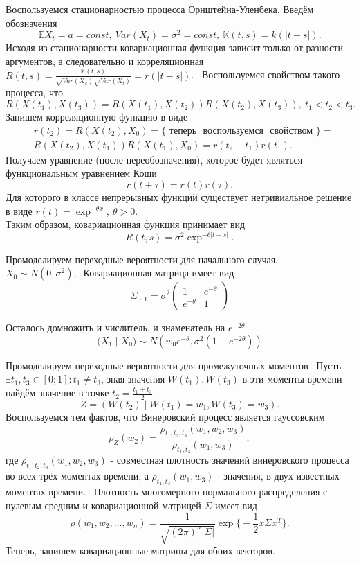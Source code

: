 \documentclass[11pt]{article}
\begin{document}
Воспользуемся стационарностью процесса Орнштейна-Уленбека. Введём обозначения
$$
    \mathbb{E}X_t = a = const,~ Var(X_t) = \sigma^2 = const,~ \mathbb{K}(t, s) = k(|t-s|).
$$
Исходя из стационарности ковариационная функция зависит только от разности аргументов, а следовательно и корреляционная $R(t, s) = \frac{\mathbb{K}(t,s)}{\sqrt{Var(X_s)} \sqrt{Var(X_t)}} = r(|t-s|)$. \
Воспользуемся свойством такого процесса, что 
$$
    R(X(t_1), X(t_3)) = R(X(t_1), X(t_2)) R(X(t_2), X(t_3)), ~ t_1 < t_2 < t_3.
$$
Запишем корреляционную функцию в виде
$$
\begin{aligned}
    & r(t_2) = R(X(t_2), X_0) = \{ \text{ теперь~ воспользуемся~ свойством } \} = \\
    & R(X(t_2), X(t_1)) R(X(t_1), X_0) = r(t_2 - t_1) r(t_1).
\end{aligned}
$$
Получаем уравнение (после переобозначения), которое будет являться функциональным уравнением Коши
$$
    r(t+ \tau) = r(t) r(\tau).
$$
Для которого в классе непрерывных функций существует нетривиальное решение в виде $r(t) = \exp^{ - \theta x},~ \theta > 0$. \\
Таким образом, ковариационная функция принимает вид
$$
    R(t, s) = \sigma^2 \exp^{- \theta |t-s|}.
$$

Промоделируем переходные вероятности для начального случая. \\
$X_0 \sim N(0, \sigma^2),~ $ Ковариационная матрица имеет вид
$$
\Sigma_{0,1} = \sigma^2
\begin{pmatrix}
1 & e^{-\theta} \\
e^{-\theta} & 1
\end{pmatrix}
$$


Осталось домножить и числитель, и знаменатель на $e^{-2\theta}$
$$
    \Big( X_1 \mid X_0 \Big) \sim N(w_0 e^{-\theta}, \sigma^2 (1 -e^{-2 \theta}))
$$ 

Промоделируем переходные вероятности для промежуточных моментов \
Пусть $\exists t_1, t_3 \in [0;1] : t_1 \ne t_3$, зная значения $W(t_1), W(t_3)$ в эти моменты времени найдём значение в точке $t_2 = \frac{t_1 + t_3}{2}$. 
$$
    Z = (W(t_2) \mid W(t_1)=w_1, W(t_3) = w_3).
$$
Воспользуемся тем фактов, что Винеровский процесс является гауссовским
$$
    \rho_Z(w_2) = \frac{\rho_{t_1,t_2,t_3}(w_1, w_2, w_3)}{\rho_{t_1, t_3}(w_1, w_3)},
$$
где $\rho_{t_1, t_2, t_3}(w_1, w_2, w_3)$ - совместная плотность значений винеровского процесса во всех трёх моментах времени, а $\rho_{t_1, t_3}(w_1, w_3)$ - значения, в двух известных моментах времени. \
Плотность многомерного нормального распределения с нулевым средним и ковариационной матрицей $\Sigma$ имеет вид
$$
    \rho(w_1, w_2, \dots, w_n) = \frac{1}{\sqrt{(2\pi)^n |\Sigma|}} \exp \Big\{- \frac{1}{2} x\Sigma x^T\Big\}.
$$
Теперь, запишем ковариационные матрицы для обоих векторов.
\end{document}
